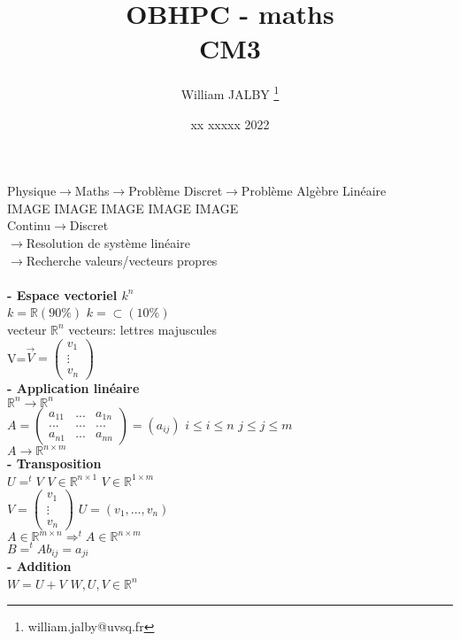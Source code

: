 \documentclass{article}
\title{OBHPC - maths\\CM3}
\author{William JALBY \thanks{william.jalby@uvsq.fr}}
\date{xx xxxxx 2022}
\begin{document}
    \maketitle
    Physique$\to$Maths$\to$Problème Discret$\to$Problème Algèbre Linéaire\\
    IMAGE IMAGE IMAGE IMAGE IMAGE\\
    Continu$\to$Discret\\
    $\to$Resolution de système linéaire\\
    $\to$Recherche valeurs/vecteurs propres\\\\
    \textbf{- Espace vectoriel $k^n$}\\
    $k = \mathbb{R}(90\%) $
    $k=\subset(10\%)$\\
    vecteur $\mathbb{R}^n$
    vecteurs: lettres majuscules\\
    V=$\vec{V}=
    \begin{pmatrix}
        v_1\\
        \vdots\\
        v_n
    \end{pmatrix}$\\
    \textbf{- Application linéaire}\\
    $\mathbb{R}^n\to\mathbb{R}^n$\\
    $A=
    \begin{pmatrix}
        a_{11} &...& a_{1n}\\
        ...&...&...\\
        a_{n1} &...& a_{nn}
    \end{pmatrix}=(a_{ij})$
    $i \leq i \leq n$
    $j \leq j \leq m$\\
    $A\to \mathbb{R}^{n\times m}$\\
    \textbf{- Transposition}\\
    $U=^tV$
    $V \in \mathbb{R}^{n \times 1}$
    $V \in \mathbb{R}^{1 \times m}$\\
    $V=
    \begin{pmatrix}
        v_1\\
        \vdots\\
        v_n
    \end{pmatrix}$
    $U=(v_1,...,v_n)$\\
    $A \in \mathbb{R}^{m \times n} \Rightarrow ^tA \in \mathbb{R}^{n \times m}$\\
    $B=^tA b_{ij}=a_{ji}$\\
    \textbf{- Addition}\\
    $W=U+V$ $W,U,V \in \mathbb{R}^n$\\
\end{document}
